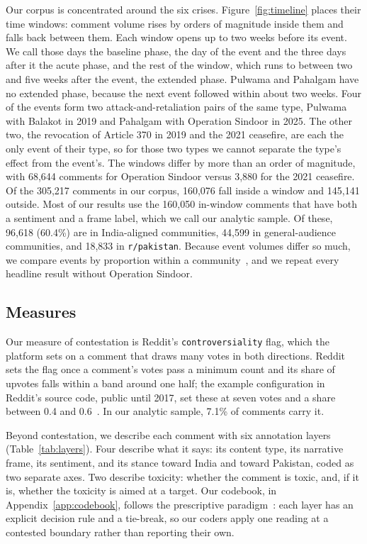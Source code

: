 Our corpus is concentrated around the six crises. Figure~\ref{fig:timeline} places their time windows: comment volume rises by orders of magnitude inside them and falls back between them. Each window opens up to two weeks before its event. We call those days the baseline phase, the day of the event and the three days after it the acute phase, and the rest of the window, which runs to between two and five weeks after the event, the extended phase. Pulwama and Pahalgam have no extended phase, because the next event followed within about two weeks. Four of the events form two attack-and-retaliation pairs of the same type, Pulwama with Balakot in 2019 and Pahalgam with Operation Sindoor in 2025. The other two, the revocation of Article 370 in 2019 and the 2021 ceasefire, are each the only event of their type, so for those two types we cannot separate the type's effect from the event's. The windows differ by more than an order of magnitude, with 68,644 comments for Operation Sindoor versus 3,880 for the 2021 ceasefire. Of the 305,217 comments in our corpus, 160,076 fall inside a window and 145,141 outside. Most of our results use the 160,050 in-window comments that have both a sentiment and a frame label, which we call our analytic sample. Of these, 96,618 (60.4\%) are in India-aligned communities, 44,599 in general-audience communities, and 18,833 in \texttt{r/pakistan}. Because event volumes differ so much, we compare events by proportion within a community~\cite{olteanu2015crisis}, and we repeat every headline result without Operation Sindoor.

\subsection{Measures}

Our measure of contestation is Reddit's \texttt{controversiality} flag, which the platform sets on a comment that draws many votes in both directions. Reddit sets the flag once a comment's votes pass a minimum count and its share of upvotes falls within a band around one half; the example configuration in Reddit's source code, public until 2017, set these at seven votes and a share between 0.4 and 0.6~\cite{reddit2017source}. In our analytic sample, 7.1\% of comments carry it.

Beyond contestation, we describe each comment with six annotation layers (Table~\ref{tab:layers}). Four describe what it says: its content type, its narrative frame, its sentiment, and its stance toward India and toward Pakistan, coded as two separate axes. Two describe toxicity: whether the comment is toxic, and, if it is, whether the toxicity is aimed at a target. Our codebook, in Appendix~\ref{app:codebook}, follows the prescriptive paradigm~\cite{rottger2022paradigms}: each layer has an explicit decision rule and a tie-break, so our coders apply one reading at a contested boundary rather than reporting their own.

